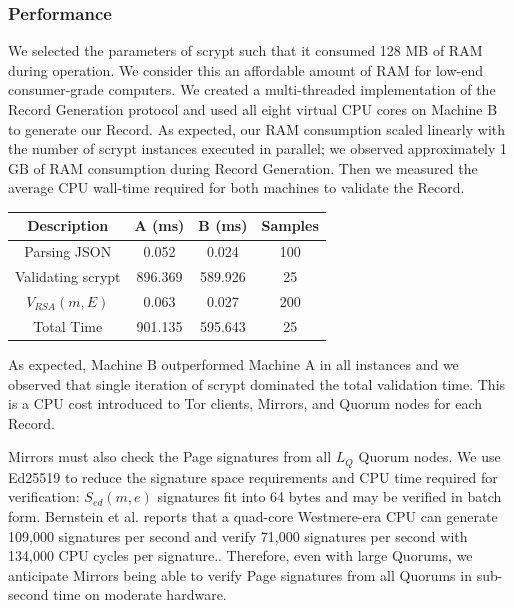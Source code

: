 \documentclass{sig-alternate}
\begin{document}
\subsubsection{Performance}

We selected the parameters of scrypt such that it consumed 128 MB of RAM during operation. We consider this an affordable amount of RAM for low-end consumer-grade computers. We created a multi-threaded implementation of the Record Generation protocol and used all eight virtual CPU cores on Machine B to generate our Record. As expected, our RAM consumption scaled linearly with the number of scrypt instances executed in parallel; we observed approximately 1 GB of RAM consumption during Record Generation. Then we measured the average CPU wall-time required for both machines to validate the Record.

\renewcommand{\arraystretch}{1}
\begin{center}
    \begin{tabular}{ | c | c | c | c |}
    \hline
    \textbf{Description} & \textbf{A (ms)} & \textbf{B (ms)} & \textbf{Samples} \\ \hline
    Parsing JSON & 0.052 & 0.024 & 100 \\ \hline
	Validating scrypt & 896.369 & 589.926 & 25 \\ \hline
	$ V_{\mathit{RSA}}(m, E) $ & 0.063 & 0.027 & 200 \\ \hline
	Total Time & 901.135 & 595.643 & 25 \\ \hline
    \end{tabular}
\end{center}

As expected, Machine B outperformed Machine A in all instances and we observed that single iteration of scrypt dominated the total validation time. This is a CPU cost introduced to Tor clients, Mirrors, and Quorum nodes for each Record.

Mirrors must also check the Page signatures from all $ L_{Q} $ Quorum nodes. We use Ed25519 to reduce the signature space requirements and CPU time required for verification: $ S_{\mathit{ed}}(m, e) $ signatures fit into 64 bytes and may be verified in batch form. Bernstein et al. reports that a quad-core Westmere-era CPU can generate 109,000 signatures per second and verify 71,000 signatures per second with 134,000 CPU cycles per signature.\cite{bernstein2011high}. Therefore, even with large Quorums, we anticipate Mirrors being able to verify Page signatures from all Quorums in sub-second time on moderate hardware.
\end{document}
